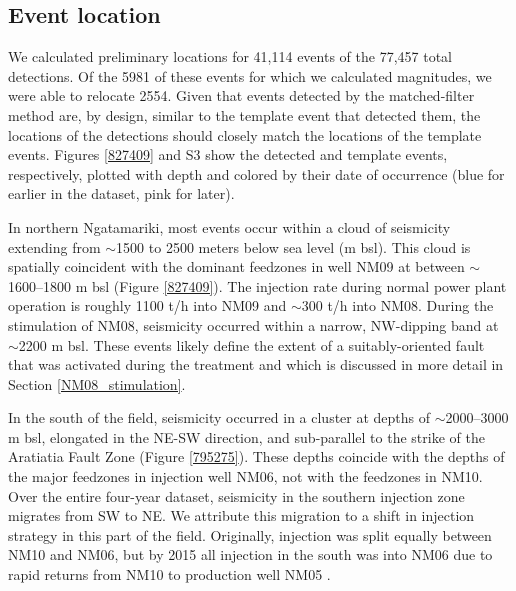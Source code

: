 \subsection{Event location} \label{location_results}
We calculated preliminary locations for 41,114 events of the 77,457 total detections. Of the 5981 of these events for which we calculated magnitudes, we were able to relocate 2554. Given that events detected by the matched-filter method are, by design, similar to the template event that detected them, the locations of the detections should closely match the locations of the template events. Figures \ref{827409} and S3 show the detected and template events, respectively, plotted with depth and colored by their date of occurrence (blue for earlier in the dataset, pink for later).

In northern Ngatamariki, most events occur within a cloud of seismicity extending from $\sim$1500 to 2500 meters below sea level (m bsl). This cloud is spatially coincident with the dominant feedzones in well NM09 at between $\sim$1600--1800 m bsl (Figure \ref{827409}). The injection rate during normal power plant operation is roughly 1100 t/h into NM09 and $\sim$300 t/h into NM08. During the stimulation of NM08, seismicity occurred within a narrow, NW-dipping band at $\sim$2200 m bsl. These events likely define the extent of a suitably-oriented fault that was activated during the treatment and which is discussed in more detail in Section \ref{NM08_stimulation}.

In the south of the field, seismicity occurred in a cluster at depths of $\sim$2000--3000 m bsl, elongated in the NE-SW direction, and sub-parallel to the strike of the Aratiatia Fault Zone (Figure \ref{795275}). These depths coincide with the depths of the major feedzones in injection well NM06, not with the feedzones in NM10. Over the entire four-year dataset, seismicity in the southern injection zone migrates from SW to NE. We attribute this migration to a shift in injection strategy in this part of the field. Originally, injection was split equally between NM10 and NM06, but by 2015 all injection in the south was into NM06 due to rapid returns from NM10 to production well NM05 \citep{buscarlet_2015}.

